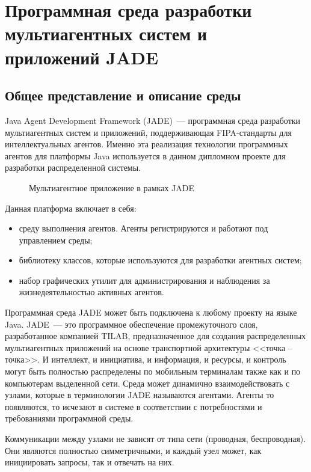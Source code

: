 \section{Программная среда разработки мультиагентных систем и приложений JADE}
\subsection{Общее представление и описание среды}
Java Agent Development Framework (JADE)~--- программная среда разработки мультиагентных систем и приложений, поддерживающая FIPA-стандарты для интеллектуальных агентов. Именно эта реализация технологии программных агентов для платформы Java используется в данном дипломном проекте для разработки распределенной системы.
\begin{figure}[h]
\caption{Мультиагентное приложение в рамках JADE}
\label{1:tanenbaum-agent}
\end{figure}

Данная платформа включает в себя:
\begin{itemize}
\item среду выполнения агентов. Агенты регистрируются и работают под управлением среды;
\item библиотеку классов, которые используются для разработки агентных систем;
\item набор графических утилит для администрирования и наблюдения за жизнедеятельностью активных агентов.
\end{itemize}

Программная среда JADE может быть подключена к любому проекту на языке Java.
JADE~--- это программное обеспечение промежуточного слоя, разработанное компанией TILAB, предназначенное для создания распределенных мультиагентных приложений на основе транспортной архитектуры <<точка -- точка>>. И интеллект, и инициатива, и информация, и ресурсы, и контроль могут быть полностью распределены по мобильным терминалам также как и по компьютерам выделенной сети. Среда может динамично взаимодействовать с узлами, которые в терминологии JADE называются агентами. Агенты то появляются, то исчезают в системе в соответствии с потребностями и требованиями программной среды.

Коммуникации между узлами не зависят от типа сети (проводная, беспроводная). Они являются полностью симметричными, и каждый узел может, как инициировать запросы, так и отвечать на них.

